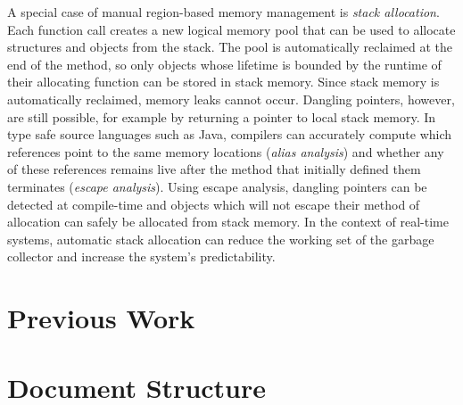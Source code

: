 		A special case of manual region-based memory management is \emph{stack allocation}. Each function call creates a new
		logical memory pool that can be used to allocate structures and objects from the stack. The pool is automatically
		reclaimed at the end of the method, so only objects whose lifetime is bounded by the runtime of their allocating
		function can be stored in stack memory. Since stack memory is automatically reclaimed, memory leaks cannot occur.
		Dangling pointers, however, are still possible, for example by returning a pointer to local stack memory. In type
		safe source languages such as Java, compilers can accurately compute which references point to the same memory
		locations (\emph{alias analysis}) and whether any of these references remains live after the method that initially
		defined them terminates (\emph{escape analysis}). Using escape analysis, dangling pointers can be detected at
		compile-time and objects which will not escape their method of allocation can safely be allocated from stack memory.
		In the context of real-time systems, automatic stack allocation can reduce the working set of the garbage collector
		and increase the system's predictability.


	\section{Previous Work}
		\label{sec:intro:prev}

	\section{Document Structure}
		\label{sec:intro:document-structure}
